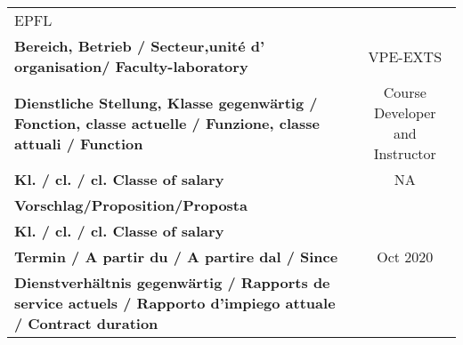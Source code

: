 \documentclass[
]{article}
\begin{document}
\begin{longtable}[]{@{}lc@{}}
\begin{minipage}[t]{0.50\columnwidth}
EPFL\strut
\end{minipage}\tabularnewline
\begin{minipage}[t]{0.44\columnwidth}\raggedright
\textbf{Bereich, Betrieb / Secteur,unité d' organisation/
Faculty-laboratory}\strut
\end{minipage} & \begin{minipage}[t]{0.50\columnwidth}\centering
VPE-EXTS\strut
\end{minipage}\tabularnewline
\begin{minipage}[t]{0.44\columnwidth}\raggedright
\textbf{Dienstliche Stellung, Klasse gegenwärtig / Fonction, classe
actuelle / Funzione, classe attuali / Function}\strut
\end{minipage} & \begin{minipage}[t]{0.50\columnwidth}\centering
Course Developer and Instructor\strut
\end{minipage}\tabularnewline
\begin{minipage}[t]{0.44\columnwidth}\raggedright
\textbf{Kl. / cl. / cl. Classe of salary}\strut
\end{minipage} & \begin{minipage}[t]{0.50\columnwidth}\centering
NA\strut
\end{minipage}\tabularnewline
\begin{minipage}[t]{0.44\columnwidth}\raggedright
\textbf{Vorschlag/Proposition/Proposta}\strut
\end{minipage} & \begin{minipage}[t]{0.50\columnwidth}\centering
\strut
\end{minipage}\tabularnewline
\begin{minipage}[t]{0.44\columnwidth}\raggedright
\textbf{Kl. / cl. / cl. Classe of salary}\strut
\end{minipage} & \begin{minipage}[t]{0.50\columnwidth}\centering
\strut
\end{minipage}\tabularnewline
\begin{minipage}[t]{0.44\columnwidth}\raggedright
\textbf{Termin / A partir du / A partire dal / Since}\strut
\end{minipage} & \begin{minipage}[t]{0.50\columnwidth}\centering
01 Oct 2020\strut
\end{minipage}\tabularnewline
\begin{minipage}[t]{0.44\columnwidth}\raggedright
\textbf{Dienstverhältnis gegenwärtig / Rapports de service actuels /
Rapporto d'impiego attuale / Contract duration}\strut

\end{minipage}
\end{longtable}
\end{document}
